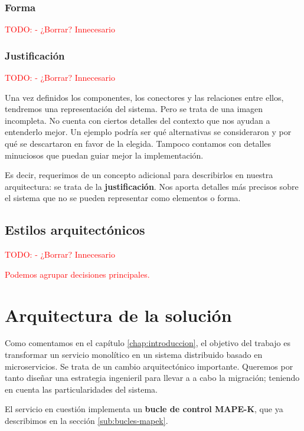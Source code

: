 \subsubsection{Forma}

\textcolor{red}{TODO:  - ¿Borrar?  Innecesario}

\subsubsection{Justificación}

\textcolor{red}{TODO:  - ¿Borrar?  Innecesario}

Una vez definidos los componentes, los conectores y las relaciones entre ellos, tendremos una representación del sistema. Pero se trata de una imagen incompleta. No cuenta con ciertos detalles del contexto que nos ayudan a entenderlo mejor. Un ejemplo podría ser qué alternativas se consideraron y por qué se descartaron en favor de la elegida. Tampoco contamos con detalles minuciosos que puedan guiar mejor la implementación.

Es decir, requerimos de un concepto adicional para describirlos en nuestra arquitectura: se trata de la \textbf{justificación}. \cite{perryFoundationsStudySoftware1992} Nos aporta detalles más precisos sobre el sistema que no se pueden representar como elementos o forma.

\subsection{Estilos arquitectónicos}

\textcolor{red}{TODO:  - ¿Borrar?  Innecesario}

\textcolor{red}{Podemos agrupar decisiones principales.}

\section{Arquitectura de la solución}

Como comentamos en el capítulo \ref{chap:introduccion}, el objetivo del trabajo es transformar un servicio monolítico en un sistema distribuido basado en microservicios. Se trata de un cambio arquitectónico importante. Queremos por tanto diseñar una estrategia ingenieril para llevar a a cabo la migración; teniendo en cuenta las particularidades del sistema.

El servicio en cuestión implementa un \textbf{bucle de control MAPE-K}\cite{ibmcorporationArchitecturalBlueprintAutonomic2006,fonsServiciosAdaptivereadyPara2021}, que ya describimos en la sección \ref{sub:bucles-mapek}.

